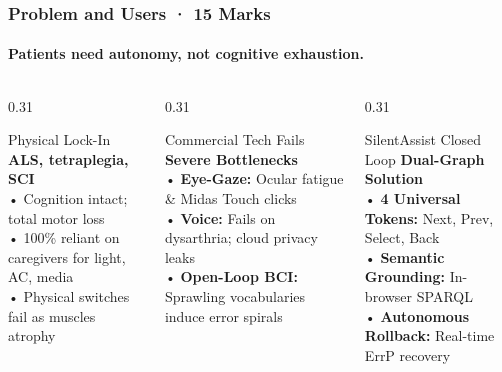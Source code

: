 \documentclass[aspectratio=169,10pt]{beamer}
\begin{document}
\begin{frame}
    \frametitle{Problem and Users · 15 Marks}
    \framesubtitle{Patients need autonomy, not cognitive exhaustion.}
    \begin{columns}[T]
        \begin{column}{0.31\textwidth}
            \begin{block}{\small Physical Lock-In}
                \scriptsize
                \textbf{ALS, tetraplegia, SCI}\\
                • Cognition intact; total motor loss\\
                • 100\% reliant on caregivers for light, AC, media\\
                • Physical switches fail as muscles atrophy
            \end{block}
        \end{column}
        \begin{column}{0.31\textwidth}
            \begin{block}{\small Commercial Tech Fails}
                \scriptsize
                \textbf{Severe Bottlenecks}\\
                • \textbf{Eye-Gaze:} Ocular fatigue \& Midas Touch clicks\\
                • \textbf{Voice:} Fails on dysarthria; cloud privacy leaks\\
                • \textbf{Open-Loop BCI:} Sprawling vocabularies induce error spirals
            \end{block}
        \end{column}
        \begin{column}{0.31\textwidth}
            \begin{block}{\small SilentAssist Closed Loop}
                \scriptsize
                \textbf{Dual-Graph Solution}\\
                • \textbf{4 Universal Tokens:} Next, Prev, Select, Back\\
                • \textbf{Semantic Grounding:} In-browser SPARQL\\
                • \textbf{Autonomous Rollback:} Real-time ErrP recovery
            \end{block}
        \end{column}
    \end{columns}
\end{frame}
\end{document}

